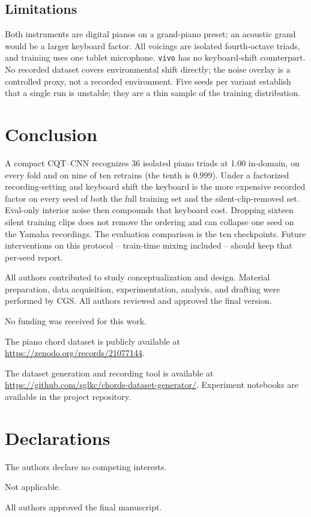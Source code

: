 \documentclass[pdflatex,sn-mathphys-num,iicol]{sn-jnl}
\begin{document}
\subsection{Limitations}\label{subsec_limitations}

Both instruments are digital pianos on a grand-piano preset; an acoustic grand would be a larger keyboard factor. All voicings are isolated fourth-octave triads, and training uses one tablet microphone. \texttt{vivo} has no keyboard-shift counterpart. No recorded dataset covers environmental shift directly; the noise overlay is a controlled proxy, not a recorded environment. Five seeds per variant establish that a single run is unstable; they are a thin sample of the training distribution.

\section{Conclusion}\label{sec_conclusion}

A compact CQT--CNN recognizes 36 isolated piano triads at 1.00 in-domain, on every fold and on nine of ten retrains (the tenth is 0.999). Under a factorized recording-setting and keyboard shift the keyboard is the more expensive recorded factor on every seed of both the full training set and the silent-clip-removed set. Eval-only interior noise then compounds that keyboard cost. Dropping sixteen silent training clips does not remove the ordering and can collapse one seed on the Yamaha recordings. The evaluation comparison is the ten checkpoints. Future interventions on this protocol -- train-time mixing included -- should keep that per-seed report.

\backmatter

All authors contributed to study conceptualization and design. Material preparation, data acquisition, experimentation, analysis, and drafting were performed by CGS. All authors reviewed and approved the final version.

No funding was received for this work.

The piano chord dataset is publicly available at \url{https://zenodo.org/records/21077144}.

The dataset generation and recording tool is available at \url{https://github.com/sglkc/chords-dataset-generator/}. Experiment notebooks are available in the project repository.

\section*{Declarations}

The authors declare no competing interests.

Not applicable.

All authors approved the final manuscript.


\end{document}
